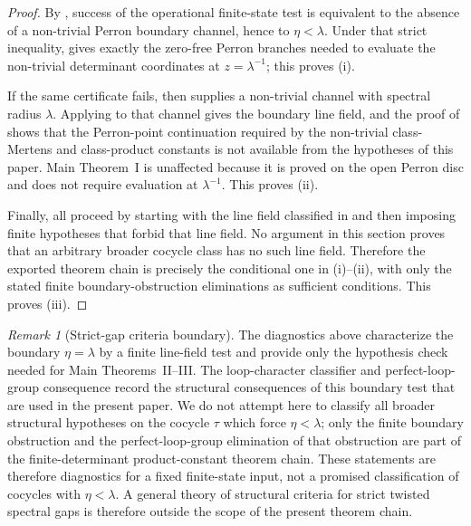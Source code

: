\documentclass[11pt,a4paper]{amsart}
\theoremstyle{plain}
\theoremstyle{definition}
\theoremstyle{remark}
\newtheorem{remark}[theorem]{Remark}
\begin{document}
\begin{proof}
  By , success of the operational
  finite-state test is equivalent to the absence of a non-trivial Perron
  boundary channel, hence to \(\eta<\lambda\).  Under that strict inequality,
   gives exactly the zero-free Perron
  branches needed to evaluate the non-trivial determinant coordinates at
  \(z=\lambda^{-1}\); this proves (i).

  If the same certificate fails, then
   supplies a non-trivial channel
  with spectral radius \(\lambda\).  Applying
   to that channel gives the boundary line field,
  and the proof of  shows that the
  Perron-point continuation required by the non-trivial class-Mertens and
  class-product constants is not available from the hypotheses of this paper.
  Main Theorem~I is unaffected because it is proved on the open Perron disc and
  does not require evaluation at \(\lambda^{-1}\).  This proves (ii).

  Finally, 
  all proceed by starting with the line field classified in
   and then imposing finite hypotheses that forbid
  that line field.  No argument in this section proves that an arbitrary
  broader cocycle class has no such line field.  Therefore the exported theorem
  chain is precisely the conditional one in (i)--(ii), with only the stated
  finite boundary-obstruction eliminations as sufficient conditions.  This proves
  (iii).
\end{proof}

\begin{remark}[Strict-gap criteria boundary]
  \label{rem:eta-gap-criteria-split}
  The diagnostics above characterize the boundary \(\eta=\lambda\) by a
  finite line-field test and provide only the hypothesis check needed for
  Main Theorems~II--III.  The loop-character classifier
   and perfect-loop-group
  consequence  record the structural
  consequences of this boundary test that are used in the present paper.
  We do not attempt here to classify all broader structural hypotheses on
  the cocycle \(\tau\) which force \(\eta<\lambda\); only the finite
  boundary obstruction and the perfect-loop-group elimination of that
  obstruction are part of the finite-determinant product-constant theorem
  chain.  These statements are therefore diagnostics for a fixed finite-state
  input, not a promised classification of cocycles with
  \(\eta<\lambda\).  A general theory of structural criteria for strict twisted spectral
  gaps is therefore outside the scope of the present theorem chain.
\end{remark}
\end{document}
